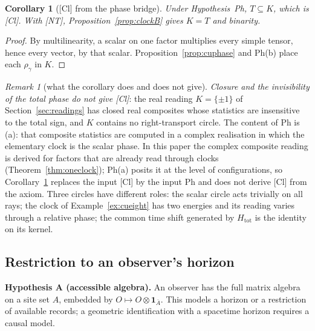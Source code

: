 \documentclass[aps,pra,onecolumn,superscriptaddress,nofootinbib,10pt]{revtex4-2}
\newtheorem{corollary}[theorem]{Corollary}
\theoremstyle{definition}
\theoremstyle{remark}
\newtheorem{remark}[theorem]{Remark}
\begin{document}
\begin{corollary}[{[Cl]} from the phase bridge]\label{cor:clbridge}
Under Hypothesis~Ph, $T\subseteq K$, which is [Cl].  With [NT], Proposition~\ref{prop:clockB} gives $K=T$ and binarity.
\end{corollary}
\begin{proof}
By multilinearity, a scalar on one factor multiplies every simple tensor, hence every vector, by that
scalar.  Proposition~\ref{prop:cuphase} and Ph(b) place each $\rho_\gamma$ in $K$.
\end{proof}

\begin{remark}[what the corollary does and does not give]\label{rem:clreal}
\emph{Closure and the invisibility of the total phase do not give [Cl]}: the real reading $K=\{\pm1\}$ of
Section~\ref{sec:readings} has closed real composites whose statistics are insensitive to the total sign, and $K$
contains no right-transport circle.  The content of Ph is (a): that composite statistics are computed in
a complex realisation in which the elementary clock is the scalar phase.  In this paper the complex
composite reading is derived for factors that are already read through clocks
(Theorem~\ref{thm:oneclock}); Ph(a) posits it at the level of configurations, so Corollary~\ref{cor:clbridge} replaces the
input [Cl] by the input Ph and does not derive [Cl] from the axiom.  Three circles have different roles:
the scalar circle acts trivially on all rays; the clock of Example~\ref{ex:cueight} has two energies and its reading
varies through a relative phase; the common time shift generated by $H_{\mathrm{tot}}$ is the identity on its kernel.
\end{remark}

\subsection{Restriction to an observer's horizon}\label{sec:cuhorizon}

\smallskip\noindent\textbf{Hypothesis A (accessible algebra).}  An observer has the full matrix algebra on a site set $A$,
embedded by $O\mapsto O\otimes\mathbf1_{\bar A}$.  This models a horizon or a restriction of available records; a geometric
identification with a spacetime horizon requires a causal model.
\end{document}
